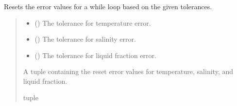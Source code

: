 \documentclass[a4paper,11pt,english,openany]{sphinxmanual}
\begin{document}
\begin{fulllineitems}
\label{\detokenize{api/spyice.statevariables:src.spyice.statevariables.reset_error_for_while_loop}}
\pysigstartsignatures
\pysiglinewithargsret
{}
{\sphinxparamcomma {}\sphinxparamcomma {}}
{}
\pysigstopsignatures
\sphinxAtStartPar
Resets the error values for a while loop based on the given tolerances.
\begin{quote}\begin{description}
\begin{itemize}
\item {} 
\sphinxAtStartPar
{} () \textendash{} The tolerance for temperature error.

\item {} 
\sphinxAtStartPar
{} () \textendash{} The tolerance for salinity error.

\item {} 
\sphinxAtStartPar
{} () \textendash{} The tolerance for liquid fraction error.

\end{itemize}

\sphinxAtStartPar
A tuple containing the reset error values for temperature, salinity, and liquid fraction.

\sphinxAtStartPar
tuple

\end{description}\end{quote}

\end{fulllineitems}

\end{document}

